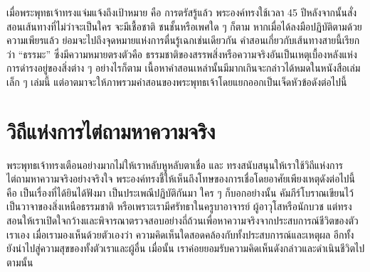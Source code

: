 \documentclass[12pt, openany]{book}
\begin{document}
เมื่อ{\wbr}พระพุทธเจ้า{\wbr}ทรง{\wbr}แจ่มแจ้ง{\wbr}ถึง{\wbr}เป้าหมาย คือ การ{\wbr}ตรัสรู้{\wbr}แล้ว พระองค์{\wbr}ทรง{\wbr}ใช้{\wbr}เวลา 45 ปี{\wbr}หลัง{\wbr}จาก{\wbr}นั้น{\wbr}สั่งสอน{\wbr}เส้นทาง{\wbr}ที่{\wbr}ไม่{\wbr}ว่า{\wbr}จะ{\wbr}เป็น{\wbr}ใคร จะ{\wbr}มี{\wbr}เชื้อชาติ ชน{\wbr}ชั้น{\wbr}หรือ{\wbr}เพศ{\wbr}ใด ๆ ก็{\wbr}ตาม หาก{\wbr}เมื่อ{\wbr}ได้{\wbr}ลงมือ{\wbr}ปฏิบัติ{\wbr}ตาม{\wbr}ด้วย{\wbr}ความ{\wbr}เพียร{\wbr}แล้ว ย่อม{\wbr}จะ{\wbr}ไป{\wbr}ถึง{\wbr}จุด{\wbr}หมาย{\wbr}แห่ง{\wbr}การ{\wbr}ตื่น{\wbr}รู้{\wbr}เฉก{\wbr}เช่น{\wbr}เดียวกัน  คําสอน{\wbr}เกี่ยว{\wbr}กับ{\wbr}เส้นทาง{\wbr}สาย{\wbr}นี้{\wbr}เรียก{\wbr}ว่า “ธรรมะ” ซึ่ง{\wbr}มี{\wbr}ความหมาย{\wbr}ตรง{\wbr}ตัว{\wbr}คือ ธรรมชาติ{\wbr}ของ{\wbr}สรรพ{\wbr}สิ่ง{\wbr}หรือ{\wbr}ความ{\wbr}จริง{\wbr}อัน{\wbr}เป็น{\wbr}เหตุ{\wbr}เบื้องหลัง{\wbr}แห่ง{\wbr}การ{\wbr}ดำรง{\wbr}อยู่{\wbr}ของ{\wbr}สิ่ง{\wbr}ต่าง ๆ  อย่างไร{\wbr}ก็{\wbr}ตาม เนื้อหา{\wbr}คำ{\wbr}สอน{\wbr}เหล่า{\wbr}นั้น{\wbr}มี{\wbr}มาก{\wbr}เกิน{\wbr}จะ{\wbr}กล่าว{\wbr}ได้{\wbr}หมด{\wbr}ใน{\wbr}หนังสือ{\wbr}เล่ม{\wbr}เล็ก ๆ เล่ม{\wbr}นี้ แต่{\wbr}อาตมา{\wbr}จะ{\wbr}ให้{\wbr}ภาพ{\wbr}รวม{\wbr}คำ{\wbr}สอน{\wbr}ของ{\wbr}พระพุทธเจ้า{\wbr}โดย{\wbr}แยก{\wbr}ออก{\wbr}เป็น{\wbr}เจ็ด{\wbr}หัวข้อ{\wbr}ดัง{\wbr}ต่อ{\wbr}ไป{\wbr}นี้{\wbr}

\section{วิถี{\wbr}แห่ง{\wbr}การ{\wbr}ไต่ถาม{\wbr}หา{\wbr}ความ{\wbr}จริง }


พระพุทธเจ้า{\wbr}ทรง{\wbr}เตือน{\wbr}อย่าง{\wbr}มาก{\wbr}ไม่{\wbr}ให้{\wbr}เรา{\wbr}หลับ{\wbr}หู{\wbr}หลับ{\wbr}ตา{\wbr}เชื่อ และ ทรง{\wbr}สนับสนุน{\wbr}ให้{\wbr}เรา{\wbr}ใช้{\wbr}วิถี{\wbr}แห่ง{\wbr}การ{\wbr}ไต่ถาม{\wbr}หา{\wbr}ความ{\wbr}จริง{\wbr}อย่าง{\wbr}จริงใจ  พระองค์{\wbr}ทรง{\wbr}ชี้{\wbr}ให้{\wbr}เห็น{\wbr}ถึง{\wbr}โทษ{\wbr}ของ{\wbr}การ{\wbr}เชื่อ{\wbr}โดย{\wbr}อาศัย{\wbr}เพียง{\wbr}เหตุ{\wbr}ดัง{\wbr}ต่อ{\wbr}ไป{\wbr}นี้ คือ เป็น{\wbr}เรื่อง{\wbr}ที่{\wbr}ได้ยิน{\wbr}ได้{\wbr}ฟัง{\wbr}มา เป็น{\wbr}ประเพณี{\wbr}ปฏิบัติ{\wbr}กัน{\wbr}มา ใคร ๆ ก็{\wbr}บอก{\wbr}อย่าง{\wbr}นั้น คัมภีร์{\wbr}โบราณ{\wbr}เขียน{\wbr}ไว้ เป็น{\wbr}วาจา{\wbr}ของ{\wbr}สิ่ง{\wbr}เหนือ{\wbr}ธรรมชาติ หรือ{\wbr}เพราะ{\wbr}เรา{\wbr}มี{\wbr}ศรัทธา{\wbr}ใน{\wbr}ครู{\wbr}บา{\wbr}อาจารย์ ผู้{\wbr}อาวุโส{\wbr}หรือ{\wbr}นักบวช  แต่{\wbr}ทรง{\wbr}สอน{\wbr}ให้{\wbr}เรา{\wbr}เปิด{\wbr}ใจ{\wbr}กว้าง{\wbr}และ{\wbr}พิจารณา{\wbr}ตรวจสอบ{\wbr}อย่าง{\wbr}ถี่ถ้วน{\wbr}เพื่อ{\wbr}หา{\wbr}ความ{\wbr}จริง{\wbr}จาก{\wbr}ประสบการณ์{\wbr}ชีวิต{\wbr}ของ{\wbr}ตัว{\wbr}เรา{\wbr}เอง  เมื่อ{\wbr}เรา{\wbr}มอง{\wbr}เห็นด้วย{\wbr}ตัวเอง{\wbr}ว่า ความคิด{\wbr}เห็น{\wbr}ใด{\wbr}สอดคล้อง{\wbr}กับ{\wbr}ทั้ง{\wbr}ประสบการณ์{\wbr}และ{\wbr}เหตุผล อีก{\wbr}ทั้ง ยัง{\wbr}นํา{\wbr}ไป{\wbr}สู่{\wbr}ความ{\wbr}สุข{\wbr}ของ{\wbr}ทั้ง{\wbr}ตัว{\wbr}เรา{\wbr}และ{\wbr}ผู้{\wbr}อื่น เมื่อนั้น เรา{\wbr}ค่อย{\wbr}ยอมรับ{\wbr}ความคิด{\wbr}เห็น{\wbr}ดัง{\wbr}กล่าว{\wbr}และ{\wbr}ดํา{\wbr}เนิน{\wbr}ชีวิต{\wbr}ไป{\wbr}ตาม{\wbr}นั้น{\wbr}
\end{document}
